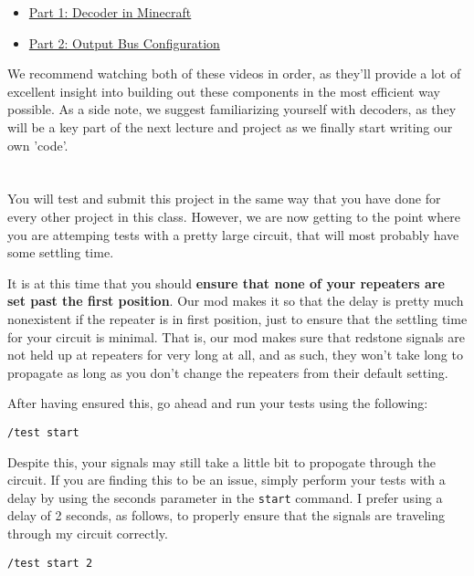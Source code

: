 \documentclass{article}
\begin{document}
\begin{itemize}
  \item \href{https://youtu.be/nx2mjjHE5Nw}{Part 1: Decoder in Minecraft}
  \item \href{https://youtu.be/pa9ISjCkKh8}{Part 2: Output Bus Configuration}
\end{itemize}

We recommend watching both of these videos in order, as they'll provide a lot of excellent insight into building out these components in the most efficient way possible.
As a side note, we suggest familiarizing yourself with decoders, as they will be a key part of the next lecture and project as we finally start writing our own 'code'.

\section{\selectfont{Testing \& Submission}}

You will test and submit this project in the same way that you have done for every other project in this class. 
However, we are now getting to the point where you are attemping tests with a pretty large circuit, that will most probably have some settling time.

It is at this time that you should \textbf{ensure that none of your repeaters are set past the first position}. 
Our mod makes it so that the delay is pretty much nonexistent if the repeater is in first position, just to ensure that the settling time for your circuit is minimal.
That is, our mod makes sure that redstone signals are not held up at repeaters for very long at all, and as such, they won't take long to propagate as long as you don't change the repeaters from their default setting.

After having ensured this, go ahead and run your tests using the following:

\begin{tcolorbox}
  \texttt{/test start}
\end{tcolorbox}

Despite this, your signals may still take a little bit to propogate through the circuit. 
If you are finding this to be an issue, simply perform your tests with a delay by using the seconds parameter in the \texttt{start} command.
I prefer using a delay of 2 seconds, as follows, to properly ensure that the signals are traveling through my circuit correctly.

\begin{tcolorbox}
  \texttt{/test start 2}
\end{tcolorbox}
\end{document}
